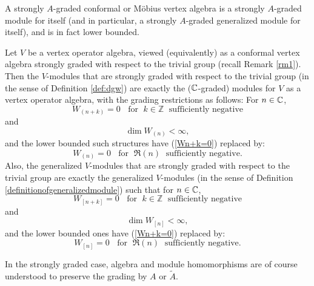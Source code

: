 \documentclass[12pt]{article}
\begin{document}
\begin{rema}\label{v-str-module}{\rm
A strongly  $A$-graded conformal or M\"{o}bius vertex algebra is a 
strongly  $A$-graded module for itself (and in particular, a 
strongly  $A$-graded generalized module for itself), and is in fact
lower bounded.}
\end{rema}

\begin{rema}\label{moduleswiththetrivialgroup}{\rm
Let $V$ be a vertex operator algebra, viewed (equivalently) as a
conformal vertex algebra strongly graded with respect to the trivial
group (recall Remark \ref{rm1}).  Then the $V$-modules that are
strongly graded with respect to the trivial group (in the sense of
Definition \ref{def:dgw}) are exactly the ($\mathbb{C}$-graded) modules for
$V$ as a vertex operator algebra, with the grading restrictions as
follows: For $n \in \mathbb{C}$,
\begin{equation}\label{Wn+k=0}
W_{(n+k)}=0 \;\; \mbox { for }\;k\in {\mathbb Z}\;\mbox{ sufficiently
negative}
\end{equation}
and
\begin{equation}\label{dimWnfinite}
\dim W_{(n)} <\infty,
\end{equation}
and the lower bounded such structures have (\ref{Wn+k=0}) replaced by:
\begin{equation}\label{ReWn=0}
W_{(n)}=0 \;\; \mbox { for }\;\Re{(n)}\;\mbox{ sufficiently
negative}.
\end{equation}
Also, the generalized $V$-modules that are strongly graded with
respect to the trivial group are exactly the generalized $V$-modules
(in the sense of Definition \ref{definitionofgeneralizedmodule}) such
that for $n \in \mathbb{C}$,
\begin{equation}\label{W[n+k]=0}
W_{[n+k]}=0 \;\; \mbox { for }\;k\in {\mathbb Z}\;\mbox{ sufficiently
negative}
\end{equation}
and
\begin{equation}
\dim W_{[n]} <\infty,
\end{equation}
and the lower bounded ones have (\ref{Wn+k=0}) replaced by:
\begin{equation}\label{ReW[n]=0}
W_{[n]}=0 \;\; \mbox { for }\;\Re{(n)}\;\mbox{ sufficiently
negative}.
\end{equation}}
\end{rema}

\begin{rema}\label{homsaregradingpreserving}{\rm
In the strongly graded case, algebra and module homomorphisms are of
course understood to preserve the grading by $A$ or $\tilde A$.}
\end{rema}
\end{document}
